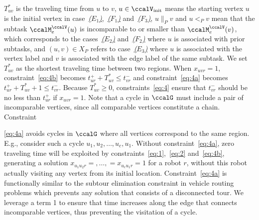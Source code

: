 \documentclass[Afour,sageh,times]{sagej}
\begin{document}
{{$T^*_{uv}$ is the traveling time from $u$ to $v$, $u \in \ccalV_{\text{init}}$ means the starting vertex $u$ is the initial vertex in case~\hyperref[sec:a]{{\it ($E_1$)}},~\hyperref[edge:vertex1]{{\it ($F_1$)}} and~\hyperref[edge:vertex3]{{\it ($F_3$)}}, $u \|_{P} v$ and $u<_{P} v$ mean that the subtask $\ccalM^\ccalV_{{e}}(u)$ is incomparable to or smaller than $\ccalM^\ccalV_e(v)$, which corresponds to the cases~\hyperref[sec:b]{{\it ($E_2$)}} and~\hyperref[edge:vertex2]{{\it ($F_2$)}} where $u$ is associated with prior subtasks, and $(u,v)\in X_P$ refers to case~\hyperref[sec:c]{{\it ($E_3$)}} where $u$ is associated with the vertex label and $v$ is associated with the edge label of the same subtask. We set $T^*_{uv}$ as the shortest traveling time between two regions. When $x_{uvr}=1$, constraint~\eqref{eq:4b} becomes $t_{ur}^+  + T^*_{uv}  \leq t_{vr}^-$ and constraint~\eqref{eq:4a} becomes $t_{ur}^+  + T^*_{uv} + 1   \leq t_{vr}^-$. Because $T^*_{uv} \geq 0$, constraints~\eqref{eq:4} ensure that $t_{vr}^-$ should be no less than $t_{ur}^+$ if $x_{uvr}=1$. Note that a cycle in $\ccalG$ must include a pair of incomparable vertices, since all comparable vertices constitute a chain. Constraint~{\eqref{eq:4a} avoids cycles in $\ccalG$ where all vertices correspond to the same region. E.g., consider such a cycle $u_1,u_2,\ldots, u_c, u_1$. Without  constraint~\eqref{eq:4a}, zero traveling time will be exploited by constraints~\eqref{eq:1},~\eqref{eq:2} and~\eqref{eq:4b}, generating a solution $x_{u_1 u_2 r} = ,\ldots,=x_{u_c u_{1} r}= 1$ for a robot $r$, without this robot actually visiting any vertex from its initial location.  Constraint~\eqref{eq:4a} is functionally similar to the subtour elimination constraint in vehicle routing problems which prevents any solution that consists of a disconnected tour. We leverage a  term 1 to ensure that time increases along the edge that connects incomparable vertices, thus preventing the visitation of a cycle.

}}}
\end{document}
